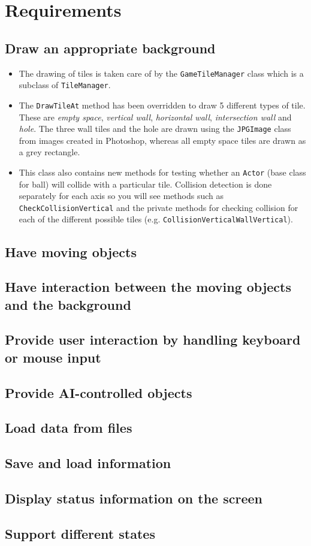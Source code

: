 \section{Requirements}

\subsection{Draw an appropriate background}

\begin{itemize}
	\item The drawing of tiles is taken care of by the \verb!GameTileManager! class which is a subclass of \verb!TileManager!.
	\item The \verb!DrawTileAt! method has been overridden to draw 5 different types of tile. These are \emph{empty space}, \emph{vertical wall}, \emph{horizontal wall}, \emph{intersection wall} and \emph{hole}. The three wall tiles and the hole are drawn using the \verb!JPGImage! class from images created in Photoshop, whereas all empty space tiles are drawn as a grey rectangle.
	\item This class also contains new methods for testing whether an \verb!Actor! (base class for ball) will collide with a particular tile. Collision detection is done separately for each axis so you will see methods such as \verb!CheckCollisionVertical! and the private methods for checking collision for each of the different possible tiles (e.g. \verb!CollisionVerticalWallVertical!).
\end{itemize}

\subsection{Have moving objects}

\subsection{Have interaction between the moving objects and the background}

\subsection{Provide user interaction by handling keyboard or mouse input}

\subsection{Provide AI-controlled objects}

\subsection{Load data from files}

\subsection{Save and load information}

\subsection{Display status information on the screen}

\subsection{Support different states}